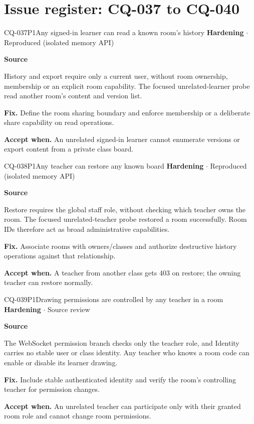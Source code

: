 \section*{Issue register: CQ-037 to CQ-040}
\begin{finding}{CQ-037}{P1}{Any signed-in learner can read a known room's history}
\textbf{Hardening} $\cdot$ Reproduced (isolated memory API)\par
\textbf{Source}\quad{}\par
History and export require only a current user, without room ownership, membership or an explicit room capability. The focused unrelated-learner probe read another room's content and version list.\par
\textbf{Fix.} Define the room sharing boundary and enforce membership or a deliberate share capability on read operations.\par
\textbf{Accept when.} An unrelated signed-in learner cannot enumerate versions or export content from a private class board.
\end{finding}
\begin{finding}{CQ-038}{P1}{Any teacher can restore any known board}
\textbf{Hardening} $\cdot$ Reproduced (isolated memory API)\par
\textbf{Source}\quad{}\par
Restore requires the global staff role, without checking which teacher owns the room. The focused unrelated-teacher probe restored a room successfully. Room IDs therefore act as broad administrative capabilities.\par
\textbf{Fix.} Associate rooms with owners/classes and authorize destructive history operations against that relationship.\par
\textbf{Accept when.} A teacher from another class gets 403 on restore; the owning teacher can restore normally.
\end{finding}
\begin{finding}{CQ-039}{P1}{Drawing permissions are controlled by any teacher in a room}
\textbf{Hardening} $\cdot$ Source review\par
\textbf{Source}\quad{}\par
The WebSocket permission branch checks only the teacher role, and Identity carries no stable user or class identity. Any teacher who knows a room code can enable or disable its learner drawing.\par
\textbf{Fix.} Include stable authenticated identity and verify the room's controlling teacher for permission changes.\par
\textbf{Accept when.} An unrelated teacher can participate only with their granted room role and cannot change room permissions.
\end{finding}
